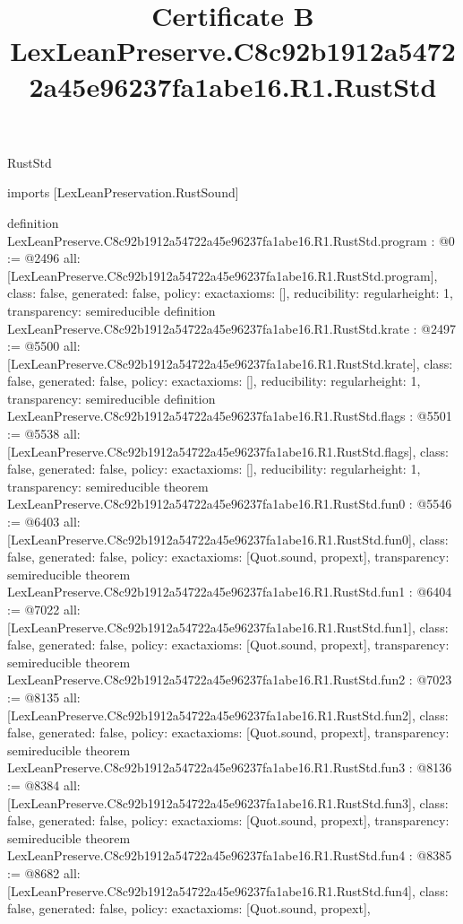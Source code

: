 \begin{lexlean}{RustStd}
\title{Certificate B LexLeanPreserve.C8c92b1912a54722a45e96237fa1abe16.R1.RustStd}
\begin{coremodule}
imports [LexLeanPreservation.RustSound]

definition LexLeanPreserve.C8c92b1912a54722a45e96237fa1abe16.R1.RustStd.program : @0 := @2496 {
  all: [LexLeanPreserve.C8c92b1912a54722a45e96237fa1abe16.R1.RustStd.program],
  class: false,
  generated: false,
  policy: exact{axioms: []},
  reducibility: regular{height: 1},
  transparency: semireducible
}
definition LexLeanPreserve.C8c92b1912a54722a45e96237fa1abe16.R1.RustStd.krate : @2497 := @5500 {
  all: [LexLeanPreserve.C8c92b1912a54722a45e96237fa1abe16.R1.RustStd.krate],
  class: false,
  generated: false,
  policy: exact{axioms: []},
  reducibility: regular{height: 1},
  transparency: semireducible
}
definition LexLeanPreserve.C8c92b1912a54722a45e96237fa1abe16.R1.RustStd.flags : @5501 := @5538 {
  all: [LexLeanPreserve.C8c92b1912a54722a45e96237fa1abe16.R1.RustStd.flags],
  class: false,
  generated: false,
  policy: exact{axioms: []},
  reducibility: regular{height: 1},
  transparency: semireducible
}
theorem LexLeanPreserve.C8c92b1912a54722a45e96237fa1abe16.R1.RustStd.fun0 : @5546 := @6403 {
  all: [LexLeanPreserve.C8c92b1912a54722a45e96237fa1abe16.R1.RustStd.fun0],
  class: false,
  generated: false,
  policy: exact{axioms: [Quot.sound, propext]},
  transparency: semireducible
}
theorem LexLeanPreserve.C8c92b1912a54722a45e96237fa1abe16.R1.RustStd.fun1 : @6404 := @7022 {
  all: [LexLeanPreserve.C8c92b1912a54722a45e96237fa1abe16.R1.RustStd.fun1],
  class: false,
  generated: false,
  policy: exact{axioms: [Quot.sound, propext]},
  transparency: semireducible
}
theorem LexLeanPreserve.C8c92b1912a54722a45e96237fa1abe16.R1.RustStd.fun2 : @7023 := @8135 {
  all: [LexLeanPreserve.C8c92b1912a54722a45e96237fa1abe16.R1.RustStd.fun2],
  class: false,
  generated: false,
  policy: exact{axioms: [Quot.sound, propext]},
  transparency: semireducible
}
theorem LexLeanPreserve.C8c92b1912a54722a45e96237fa1abe16.R1.RustStd.fun3 : @8136 := @8384 {
  all: [LexLeanPreserve.C8c92b1912a54722a45e96237fa1abe16.R1.RustStd.fun3],
  class: false,
  generated: false,
  policy: exact{axioms: [Quot.sound, propext]},
  transparency: semireducible
}
theorem LexLeanPreserve.C8c92b1912a54722a45e96237fa1abe16.R1.RustStd.fun4 : @8385 := @8682 {
  all: [LexLeanPreserve.C8c92b1912a54722a45e96237fa1abe16.R1.RustStd.fun4],
  class: false,
  generated: false,
  policy: exact{axioms: [Quot.sound, propext]},
}
\end{coremodule}
\end{lexlean}
